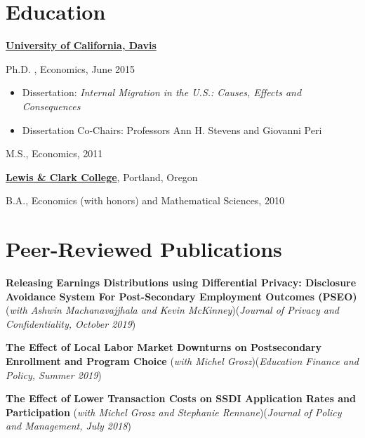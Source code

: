 \documentclass[margin,line]{res}
\newenvironment{list1}{
  \begin{list}{\ding{113}}{%
      \setlength{\itemsep}{0in}
      \setlength{\parsep}{0in} \setlength{\parskip}{0in}
      \setlength{\topsep}{0in} \setlength{\partopsep}{0in} 
      \setlength{\leftmargin}{0.17in}}}{\end{list}}
\begin{document}
\begin{resume}
\section{\sc Education}
\href{http://www.econ.ucdavis.edu/}{\bf University of California, Davis}\\
\vspace*{-.15in}\begin{list1}
\item[] Ph.D. , Economics, June 2015
	\begin{itemize}
 \setlength{\itemsep}{0cm}%
  \setlength{\parskip}{0cm}%
		\item Dissertation: \textit{Internal Migration in the U.S.: Causes, Effects and Consequences}
		\item Dissertation Co-Chairs: Professors Ann H. Stevens and Giovanni Peri
	\end{itemize}

\vspace*{-.05in}
\item[] M.S., Economics, 2011
\end{list1}

\href{http://college.lclark.edu/departments/economics/}{\bf Lewis \& Clark College}, Portland, Oregon\\
\vspace*{-.15in}
\begin{list1}
\item[] B.A., Economics (with honors) and Mathematical Sciences, 2010
\end{list1}


\section{\sc Peer-Reviewed Publications}

\textbf{Releasing Earnings Distributions using Differential Privacy: Disclosure Avoidance System For Post-Secondary Employment Outcomes (PSEO)}(\emph{with Ashwin Machanavajjhala and Kevin McKinney})(\emph{Journal of Privacy and Confidentiality, October 2019})

\textbf{The Effect of Local Labor Market Downturns on Postsecondary Enrollment and Program Choice} (\emph{with Michel Grosz})(\emph{Education Finance and Policy, Summer 2019})

\textbf{The Effect of Lower Transaction Costs on SSDI Application Rates and Participation} (\emph{with Michel Grosz and Stephanie Rennane})(\emph{Journal of Policy and Management, July 2018})


\end{resume}
\end{document}
